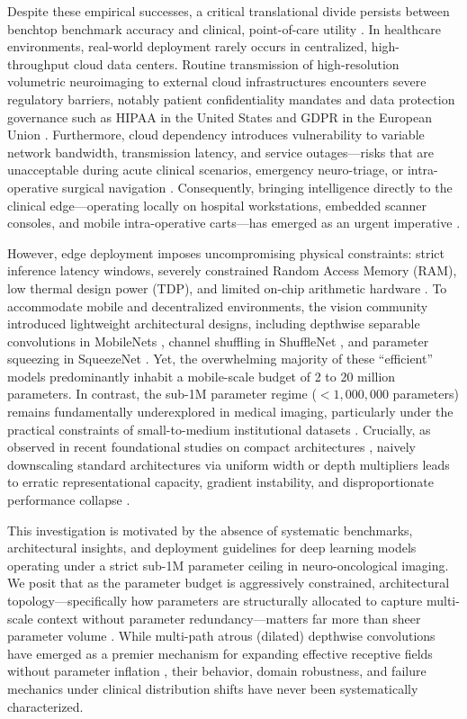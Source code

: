 ﻿\documentclass[journal]{IEEEtran}
\begin{document}
Despite these empirical successes, a critical translational divide persists between benchtop benchmark accuracy and clinical, point-of-care utility \cite{20, 26}. In healthcare environments, real-world deployment rarely occurs in centralized, high-throughput cloud data centers. Routine transmission of high-resolution volumetric neuroimaging to external cloud infrastructures encounters severe regulatory barriers, notably patient confidentiality mandates and data protection governance such as HIPAA in the United States and GDPR in the European Union \cite{10, 26}. Furthermore, cloud dependency introduces vulnerability to variable network bandwidth, transmission latency, and service outages---risks that are unacceptable during acute clinical scenarios, emergency neuro-triage, or intra-operative surgical navigation \cite{20, 33}. Consequently, bringing intelligence directly to the clinical edge---operating locally on hospital workstations, embedded scanner consoles, and mobile intra-operative carts---has emerged as an urgent imperative \cite{12, 25, 26}.

However, edge deployment imposes uncompromising physical constraints: strict inference latency windows, severely constrained Random Access Memory (RAM), low thermal design power (TDP), and limited on-chip arithmetic hardware \cite{12, 33, 41}. To accommodate mobile and decentralized environments, the vision community introduced lightweight architectural designs, including depthwise separable convolutions in MobileNets \cite{15, 37}, channel shuffling in ShuffleNet \cite{32}, and parameter squeezing in SqueezeNet \cite{17}. Yet, the overwhelming majority of these ``efficient'' models predominantly inhabit a mobile-scale budget of 2 to 20 million parameters. In contrast, the sub-1M parameter regime ($<1,000,000$ parameters) remains fundamentally underexplored in medical imaging, particularly under the practical constraints of small-to-medium institutional datasets \cite{3, 21}. Crucially, as observed in recent foundational studies on compact architectures \cite{21}, naively downscaling standard architectures via uniform width or depth multipliers leads to erratic representational capacity, gradient instability, and disproportionate performance collapse \cite{21, 24}.

This investigation is motivated by the absence of systematic benchmarks, architectural insights, and deployment guidelines for deep learning models operating under a strict sub-1M parameter ceiling in neuro-oncological imaging. We posit that as the parameter budget is aggressively constrained, architectural topology---specifically how parameters are structurally allocated to capture multi-scale context without parameter redundancy---matters far more than sheer parameter volume \cite{21}. While multi-path atrous (dilated) depthwise convolutions have emerged as a premier mechanism for expanding effective receptive fields without parameter inflation \cite{5, 21}, their behavior, domain robustness, and failure mechanics under clinical distribution shifts have never been systematically characterized.
\end{document}
